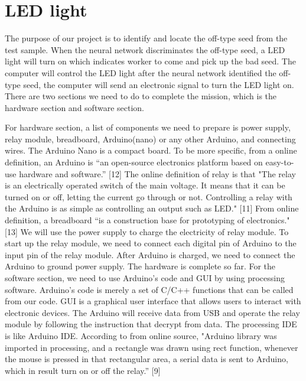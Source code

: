 \documentclass[onecolumn, draftclsnofoot,10pt, compsoc]{IEEEtran}
\begin{document}
\section{LED light}
\par
The purpose of our project is to identify and locate the off-type seed from the test sample. When the neural network discriminates the off-type seed, a LED light will turn on which indicates worker to come and pick up the bad seed. The computer will control the LED light after the neural network identified the off-type seed, the computer will send an electronic signal to turn the LED light on. There are two sections we need to do to complete the mission, which is the hardware section and software section. 
\par
For hardware section, a list of components we need to prepare is power supply, relay module, breadboard, Arduino(nano) or any other Arduino, and connecting wires. The Arduino Nano is a compact board. To be more specific, from a online definition, an Arduino is “an open-source electronics platform based on easy-to-use hardware and software.” [12]  The online definition of relay is that "The relay is an electrically operated switch of the main voltage. It means that it can be turned on or off, letting the current go through or not. Controlling a relay with the Arduino is as simple as controlling an output such as LED." [11] From online definition, a breadboard “is a construction base for prototyping of electronics." [13] We will use the power supply to charge the electricity of relay module. To start up the relay module, we need to connect each digital pin of Arduino to the input pin of the relay module. After Arduino is charged, we need to connect the Arduino to ground power supply. The hardware is complete so far. For the software section, we need to use Arduino's code and GUI by using processing software. Arduino's code is merely a set of C/C++ functions that can be called from our code. GUI is a graphical user interface that allows users to interact with electronic devices. The Arduino will receive data from USB and operate the relay module by following the instruction that decrypt from data. The processing IDE is like Arduino IDE. According to from online source, "Arduino library was imported in processing, and a rectangle was drawn using rect function, whenever the mouse is pressed in that rectangular area, a serial data is sent to Arduino, which in result turn on or off the relay.” [9]
\par
\end{document}
